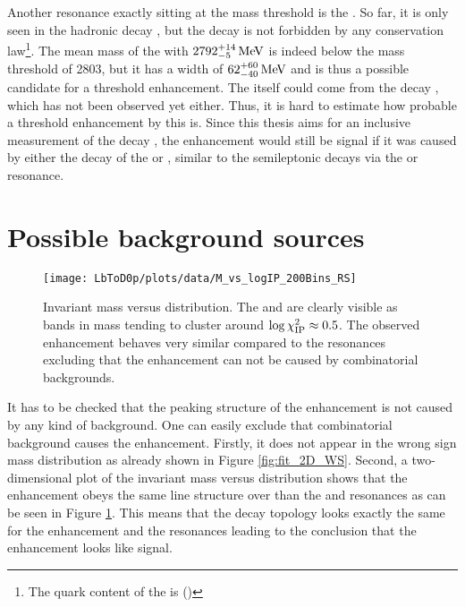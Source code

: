 Another resonance exactly sitting at the \Dz\proton mass threshold is the .
So far, it is only seen in the hadronic decay , but the decay  is not forbidden by any conservation law\footnote{The quark content of the  is (\uquark\dquark\cquark)}.
The mean mass of the  with $2792^{+14}_{-5}\mathrm{\,Me\kern -0.1em V}$ is indeed below the \Dz\proton mass threshold of 2803\mev, but it has a width of $62^{+60}_{-40}\mathrm{\,Me\kern -0.1em V}$ \cite{PDG} and is thus a possible candidate for a threshold enhancement.
The  itself could come from the decay , which has not been observed yet either.
Thus, it is hard to estimate how probable a threshold enhancement by this  is.
Since this thesis aims for an inclusive measurement of the decay \LbToDpmunuX, the enhancement would still be signal if it was caused by either the decay of the  or , similar to the semileptonic \Lb decays via the \LcResI or \LcResII resonance.

\section{Possible background sources}
\begin{figure}[tbp]
	\centering
	\texttt{[image: LbToD0p/plots/data/M\_vs\_logIP\_200Bins\_RS]}
	\caption{Invariant \Dz\proton mass versus \logIP distribution. The \LcResI and \LcResII are clearly visible as bands in \Dz\proton mass tending to cluster around $\log \chi^2_{\text{IP}} \approx 0.5$. The observed enhancement behaves very similar compared to the resonances excluding that the enhancement can not be caused by combinatorial backgrounds.}
	\label{fig:plot_M_vs_logIP}
\end{figure}
It has to be checked that the peaking structure of the enhancement is not caused by any kind of background.
One can easily exclude that combinatorial background causes the enhancement.
Firstly, it does not appear in the wrong sign \Dz\proton mass distribution as already shown in Figure \ref{fig:fit_2D_WS}.
Second, a two-dimensional plot of the invariant \Dz\proton mass versus \logIP distribution shows that the enhancement obeys the same line structure over \logIP than the \LcResI and \LcResII resonances as can be seen in Figure \ref{fig:plot_M_vs_logIP}.
This means that the decay topology looks exactly the same for the enhancement and the resonances leading to the conclusion that the enhancement looks like signal.

